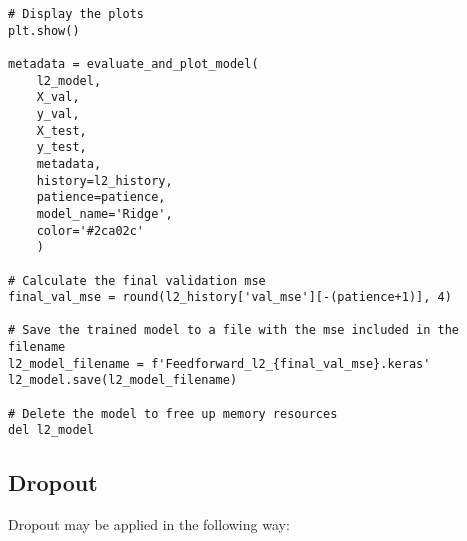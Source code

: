 \begin{lstlisting}[style=Python]
# Display the plots
plt.show()

metadata = evaluate_and_plot_model(
    l2_model,
    X_val,
    y_val,
    X_test,
    y_test,
    metadata,
    history=l2_history,
    patience=patience,
    model_name='Ridge',
    color='#2ca02c'
    )

# Calculate the final validation mse
final_val_mse = round(l2_history['val_mse'][-(patience+1)], 4)

# Save the trained model to a file with the mse included in the filename
l2_model_filename = f'Feedforward_l2_{final_val_mse}.keras'
l2_model.save(l2_model_filename)

# Delete the model to free up memory resources
del l2_model
\end{lstlisting}

\subsection{Dropout}
Dropout may be applied in the following way: 
